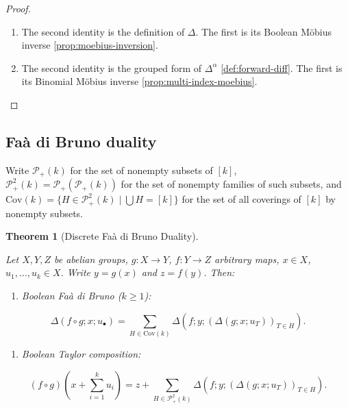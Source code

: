 \documentclass[10pt,a4paper]{article}
\theoremstyle{plain}
\newtheorem{theorem}{Theorem}
\theoremstyle{definition}
\newcommand{\1}{\mathbb{1}} %
\newcommand{\set}[1]{\{#1\}} %
\newcommand{\KP}{\mathcal{P}}
\newcommand{\tightlist}{\setlength{\itemsep}{0pt}\setlength{\parskip}{0pt}}
\newcommand{\Cov}{\mathrm{Cov}} %
\begin{document}
\begin{proof}

\begin{enumerate}
\def\labelenumi{\arabic{enumi})}
\item
  The second identity is the definition of \(\Delta\). The first is its
  Boolean Möbius inverse \ref{prop:moebius-inversion}.
\item
  The second identity is the grouped form of \(\Delta^\alpha\)
  \ref{def:forward-diff}. The first is its Binomial Möbius inverse
  \ref{prop:multi-index-moebius}.
\end{enumerate}

\end{proof}

\subsection{Faà di Bruno duality}\label{fauxe0-di-bruno-duality}

Write \(\KP_+(k)\) for the set of nonempty subsets of \([k]\),
\(\KP_+^2(k) = \KP_+(\KP_+(k))\) for the set of nonempty families of
such subsets, and
\(\Cov(k) = \set{H \in \KP_+^2(k) \mid \bigcup H = [k]}\) for the set of
all coverings of \([k]\) by nonempty subsets.

\begin{theorem}[Discrete Faà di Bruno Duality]

\label{thm:dfdb}

Let \(X, Y, Z\) be abelian groups, \(g: X \to Y\), \(f: Y \to Z\)
arbitrary maps, \(x \in X\), \(u_1, \dots, u_k \in X\). Write
\(y = g(x)\) and \(z = f(y)\). Then:

\begin{enumerate}
\def\labelenumi{\arabic{enumi})}
\tightlist
\item
  \emph{Boolean Faà di Bruno} (\(k \geq 1\))\emph{:}
\end{enumerate}

\[
  \Delta(f \circ g; x; u_\bullet)
  =
  \sum_{H \in \Cov(k)}
  \Delta(f; y; (\Delta(g; x; u_T))_{T \in H}).
\]

\begin{enumerate}
\def\labelenumi{\arabic{enumi})}
\setcounter{enumi}{1}
\tightlist
\item
  \emph{Boolean Taylor composition:}
\end{enumerate}

\[
  (f \circ g)(x + {\textstyle\sum_{i=1}^k} u_i) = z + \sum_{H \in \KP_+^2(k)} \Delta(f; y; (\Delta(g; x; u_T))_{T \in H}).
\]

\end{theorem}
\end{document}

